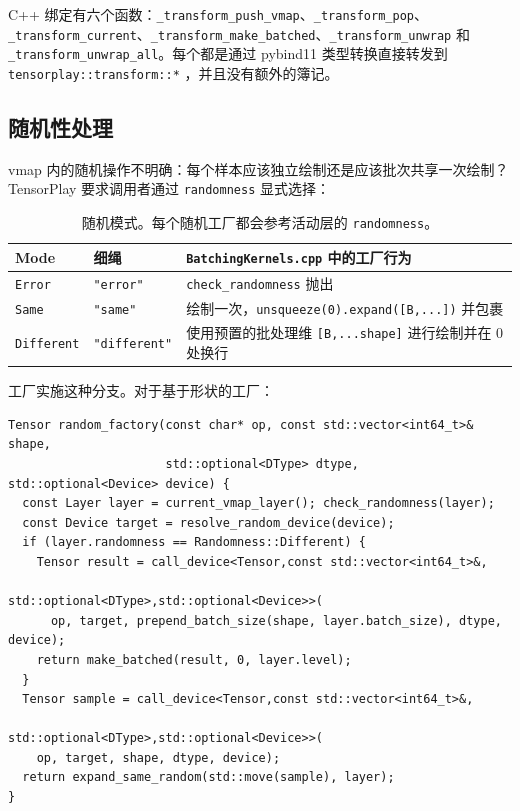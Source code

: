 C++ 绑定有六个函数：\texttt{\_transform\_push\_vmap}、\texttt{\_transform\_pop}、\texttt{\_transform\_current}、\texttt{\_transform\_make\_batched}、\texttt{\_transform\_unwrap} 和 \texttt{\_transform\_unwrap\_all}。每个都是通过 pybind11 类型转换直接转发到 \texttt{tensorplay::transform::*} ，并且没有额外的簿记。

\subsection{随机性处理}
\label{sec:randomness}

vmap 内的随机操作不明确：每个样本应该独立绘制还是应该批次共享一次绘制？ TensorPlay 要求调用者通过 \texttt{randomness} 显式选择：

\begin{table}[H]
\centering
\caption{随机模式。每个随机工厂都会参考活动层的 \texttt{randomness}。}
\label{tab:randomness}
\small
\begin{tabular}{lll}
\toprule
Mode & 细绳 & \texttt{BatchingKernels.cpp} 中的工厂行为 \\
\midrule
\texttt{Error} & \texttt{"error"} & \texttt{check\_randomness} 抛出 \\
\texttt{Same} & \texttt{"same"} & 绘制一次，\texttt{unsqueeze(0).expand([B,...])} 并包裹 \\
\texttt{Different} & \texttt{"different"} & 使用预置的批处理维 \texttt{[B,...shape]} 进行绘制并在 0 处换行 \\
\bottomrule
\end{tabular}
\end{table}

工厂实施这种分支。对于基于形状的工厂：

\begin{lstlisting}[caption={random factory.}, label=lst:randfactory]
Tensor random_factory(const char* op, const std::vector<int64_t>& shape,
                      std::optional<DType> dtype, std::optional<Device> device) {
  const Layer layer = current_vmap_layer(); check_randomness(layer);
  const Device target = resolve_random_device(device);
  if (layer.randomness == Randomness::Different) {
    Tensor result = call_device<Tensor,const std::vector<int64_t>&,
                                std::optional<DType>,std::optional<Device>>(
      op, target, prepend_batch_size(shape, layer.batch_size), dtype, device);
    return make_batched(result, 0, layer.level);
  }
  Tensor sample = call_device<Tensor,const std::vector<int64_t>&,
                              std::optional<DType>,std::optional<Device>>(
    op, target, shape, dtype, device);
  return expand_same_random(std::move(sample), layer);
}
\end{lstlisting}

